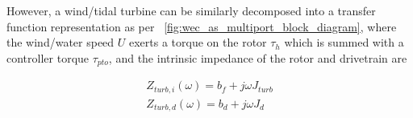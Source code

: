 \documentclass[lettersize,journal]{IEEEtran}
\begin{document}
However, a wind/tidal turbine can be similarly decomposed into a transfer function representation as per \figurename~\ref{fig:wec_as_multiport_block_diagram}, where the wind/water speed $U$ exerts a torque on the rotor $\tau_h$ which is summed with a controller torque $\tau_{pto}$, and the intrinsic impedance of the rotor and drivetrain are

\begin{subequations}
                
        \begin{gather}
                Z_{turb,i}(\omega)=b_f + j\omega J_{turb} \\
                Z_{turb,d}(\omega)=b_d + j\omega J_d
        \end{gather}
\end{subequations}
\end{document}
